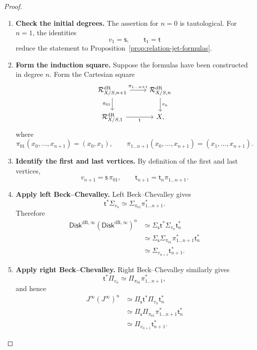 \begin{proof}
\leavevmode
\begin{enumerate}[label=\textup{(\arabic*)}]
    \item \textbf{Check the initial degrees.}
The assertion for \(n=0\) is tautological. For \(n=1\), the identities
\[
  v_1=\mathsf s,
  \qquad
  \mathsf t_1=\mathsf t
\]
reduce the statement to Proposition~\ref{prop:relation-jet-formulas}.

    \item \textbf{Form the induction square.}
Suppose the formulas have been constructed in degree \(n\). Form the
Cartesian square
\[
\begin{tikzcd}
\mathcal R^{\mathrm{dR}}_{X/S,n+1} \ar[r,"\pi_{1\ldots n+1}"] \ar[d,"\pi_{01}"']
  & \mathcal R^{\mathrm{dR}}_{X/S,n} \ar[d,"v_n"]\\
\mathcal R^{\mathrm{dR}}_{X/S,1} \ar[r,"\mathsf t"']
  & X,
\end{tikzcd}
\]
where
\[
  \pi_{01}(x_0,\ldots,x_{n+1})=(x_0,x_1),
  \qquad
  \pi_{1\ldots n+1}(x_0,\ldots,x_{n+1})=(x_1,\ldots,x_{n+1}).
\]

    \item \textbf{Identify the first and last vertices.}
By definition of the first and last vertices,
\[
  v_{n+1}=\mathsf s\,\pi_{01},
  \qquad
  \mathsf t_{n+1}=\mathsf t_n\pi_{1\ldots n+1}.
\]

    \item \textbf{Apply left Beck--Chevalley.}
Left Beck--Chevalley gives
\[
  \mathsf t^*\Sigma_{v_n}
  \simeq
  \Sigma_{\pi_{01}}\pi_{1\ldots n+1}^*.
\]
Therefore
\[
\begin{aligned}
  \mathsf{Disk}^{\mathrm{dR},\infty}(\mathsf{Disk}^{\mathrm{dR},\infty})^n
  &\simeq
  \Sigma_{\mathsf s}\mathsf t^*
  \Sigma_{v_n}\mathsf t_n^*\\
  &\simeq
  \Sigma_{\mathsf s}\Sigma_{\pi_{01}}\pi_{1\ldots n+1}^*\mathsf t_n^*\\
  &\simeq
  \Sigma_{v_{n+1}}\mathsf t_{n+1}^*.
\end{aligned}
\]

    \item \textbf{Apply right Beck--Chevalley.}
Right Beck--Chevalley similarly gives
\[
  \mathsf t^*\Pi_{v_n}
  \simeq
  \Pi_{\pi_{01}}\pi_{1\ldots n+1}^*,
\]
and hence
\[
\begin{aligned}
  J^\infty(J^\infty)^n
  &\simeq
  \Pi_{\mathsf s}\mathsf t^*
  \Pi_{v_n}\mathsf t_n^*\\
  &\simeq
  \Pi_{\mathsf s}\Pi_{\pi_{01}}\pi_{1\ldots n+1}^*\mathsf t_n^*\\
  &\simeq
  \Pi_{v_{n+1}}\mathsf t_{n+1}^*.
\end{aligned}
\]


\end{enumerate}
\end{proof}
